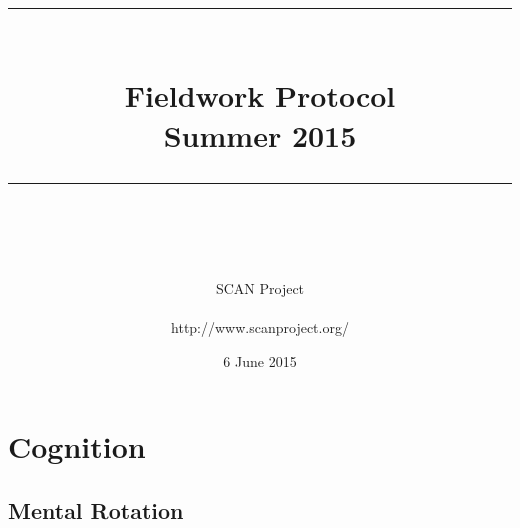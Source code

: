 \documentclass{article}
\newcommand{\HRule}{\rule{\linewidth}{0.5mm}} %
\begin{document}

\title{
\begin{center}
\HRule \\[0.4cm]
{\Huge \bfseries Fieldwork Protocol \\[0.5cm] \Large Summer 2015}\\[0.4cm] %
\HRule \\[1.5cm]
\end{center}
}
\author{\Huge SCAN Project\\ \\ \LARGE http://www.scanproject.org/ \\[2cm]} %
\date{6 June 2015} %
\maketitle


\newpage

\tableofcontents

\newpage


\section{Cognition}

\subsection{Mental Rotation}
\end{document}
